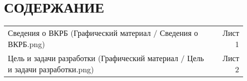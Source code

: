 \newsection
\section*{СОДЕРЖАНИЕ}
\tableofcontents
{}
{\parindent0pt
	\begin{xltabular}{\linewidth}{@{}p{0.85\linewidth}r{0.124\linewidth}} 
		Сведения о ВКРБ (Графический материал / Сведения о ВКРБ.png) & Лист 1\\
		Цель и задачи разработки (Графический материал / Цель и задачи разработки.png) & Лист 2\\
	\end{xltabular}
}

